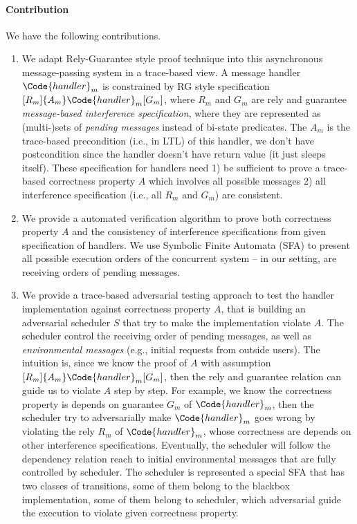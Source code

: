\paragraph{Contribution} We have the following contributions.

\begin{enumerate}
    \item We adapt Rely-Guarantee style proof technique into this asynchronous message-passing system in a trace-based view. A message handler $\Code{handler}_m$ is constrained by RG style specification $[R_m]\{A_{m}\}\Code{handler}_m[G_m]$, where $R_m$ and $G_m$ are rely and guarantee \emph{message-based interference specification}, where they are represented as (multi-)sets of \emph{pending messages} instead of bi-state predicates. The $A_{m}$ is the trace-based precondition (i.e., in LTL) of this handler, we don't have postcondition since the handler doesn't have return value (it just sleeps itself). These specification for handlers need 1) be sufficient to prove a trace-based correctness property $A$ which involves all possible messages 2) all interference specification (i.e., all $R_m$ and $G_m$) are consistent.
    \item We provide a automated verification algorithm to prove both correctness property $A$ and the consistency of interference specifications from given specification of handlers. We use Symbolic Finite Automata (SFA) to present all possible execution orders of the concurrent system -- in our setting, are receiving orders of pending messages.
    \item We provide a trace-based adversarial testing approach to test the handler implementation against correctness property $A$, that is building an adversarial scheduler $S$ that try to make the implementation violate $A$. The scheduler control the receiving order of pending messages, as well as \emph{environmental messages} (e.g., initial requests from outside users). The intuition is, since we know the proof of $A$ with assumption $[R_m]\{A_{m}\}\Code{handler}_m[G_m]$, then the rely and guarantee relation can guide us to violate $A$ step by step. For example, we know the correctness property is depends on guarantee $G_m$ of $\Code{handler}_m$, then the scheduler try to adversarially make $\Code{handler}_m$ goes wrong by violating the rely $R_m$ of $\Code{handler}_m$, whose correctness are depends on other interference specifications. Eventually, the scheduler will follow the dependency relation reach to initial environmental messages that are fully controlled by scheduler. The scheduler is represented a special SFA that has two classes of transitions, some of them belong to the blackbox implementation, some of them belong to scheduler, which adversarial guide the execution to violate given correctness property.
\end{enumerate}

